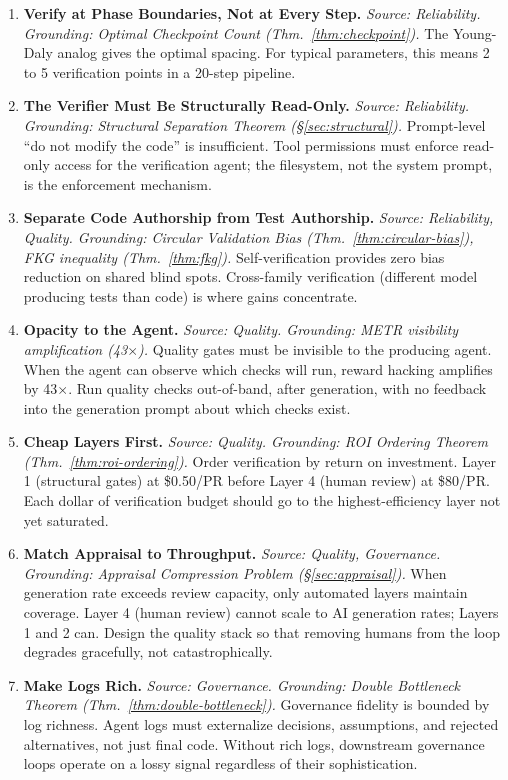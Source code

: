 \documentclass[11pt, a4paper, logo, copyright]{googledeepmind}
\begin{document}
\begin{enumerate}[label=\textbf{P\arabic*.}, leftmargin=3em]
\item \textbf{Verify at Phase Boundaries, Not at Every Step.}
\emph{Source: Reliability. Grounding: Optimal Checkpoint Count (Thm.~\ref{thm:checkpoint}).}
The Young-Daly analog gives the optimal spacing. For typical parameters, this means 2 to 5 verification points in a 20-step pipeline.

\item \textbf{The Verifier Must Be Structurally Read-Only.}
\emph{Source: Reliability. Grounding: Structural Separation Theorem (\S\ref{sec:structural}).}
Prompt-level ``do not modify the code'' is insufficient. Tool permissions must enforce read-only access for the verification agent; the filesystem, not the system prompt, is the enforcement mechanism.

\item \textbf{Separate Code Authorship from Test Authorship.}
\emph{Source: Reliability, Quality. Grounding: Circular Validation Bias (Thm.~\ref{thm:circular-bias}), FKG inequality (Thm.~\ref{thm:fkg}).}
Self-verification provides zero bias reduction on shared blind spots. Cross-family verification (different model producing tests than code) is where gains concentrate.

\item \textbf{Opacity to the Agent.}
\emph{Source: Quality. Grounding: METR visibility amplification (43$\times$).}
Quality gates must be invisible to the producing agent. When the agent can observe which checks will run, reward hacking amplifies by 43$\times$. Run quality checks out-of-band, after generation, with no feedback into the generation prompt about which checks exist.

\item \textbf{Cheap Layers First.}
\emph{Source: Quality. Grounding: ROI Ordering Theorem (Thm.~\ref{thm:roi-ordering}).}
Order verification by return on investment. Layer 1 (structural gates) at \$0.50/PR before Layer 4 (human review) at \$80/PR. Each dollar of verification budget should go to the highest-efficiency layer not yet saturated.

\item \textbf{Match Appraisal to Throughput.}
\emph{Source: Quality, Governance. Grounding: Appraisal Compression Problem (\S\ref{sec:appraisal}).}
When generation rate exceeds review capacity, only automated layers maintain coverage. Layer 4 (human review) cannot scale to AI generation rates; Layers 1 and 2 can. Design the quality stack so that removing humans from the loop degrades gracefully, not catastrophically.

\item \textbf{Make Logs Rich.}
\emph{Source: Governance. Grounding: Double Bottleneck Theorem (Thm.~\ref{thm:double-bottleneck}).}
Governance fidelity is bounded by log richness. Agent logs must externalize decisions, assumptions, and rejected alternatives, not just final code. Without rich logs, downstream governance loops operate on a lossy signal regardless of their sophistication.

\end{enumerate}
\end{document}
